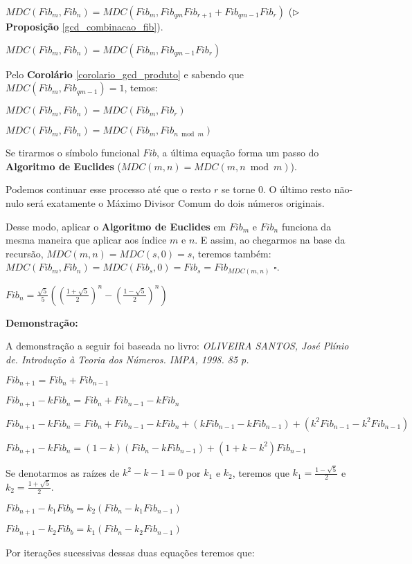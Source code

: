 $MDC(Fib_m, Fib_n) = MDC(Fib_m, Fib_{qm}Fib_{r+1} + Fib_{qm-1}Fib_{r})$ ($\triangleright$ \textbf{Proposição} \autoref{gcd_combinacao_fib}).

$MDC(Fib_m, Fib_n) = MDC(Fib_m, Fib_{qm-1}Fib_{r})$

Pelo \textbf{Corolário} \autoref{corolario_gcd_produto} e sabendo que $MDC(Fib_m,Fib_{qm-1})=1$, temos:

$MDC(Fib_m, Fib_n) = MDC(Fib_m, Fib_{r})$

$MDC(Fib_m, Fib_n) = MDC(Fib_m, Fib_{n \bmod m})$

Se tirarmos o símbolo funcional $Fib$, a última equação forma um passo do \textbf{Algoritmo de Euclides} ($MDC(m,n) = MDC(m, n \bmod m)$).

Podemos continuar esse processo até que o resto $r$ se torne $0$. O último resto não-nulo será
exatamente o Máximo Divisor Comum do dois números originais.

Desse modo, aplicar o \textbf{Algoritmo de Euclides} em $Fib_m$ e $Fib_n$ funciona da mesma maneira que aplicar aos índice $m$ e $n$.
E assim, ao chegarmos na base da recursão, $MDC(m,n) = MDC(s,0) = s$, teremos também: $MDC(Fib_m,Fib_n) = MDC(Fib_s,0) = Fib_s = Fib_{MDC(m,n)}$ $\square$.


\begin{theorem}\label{fibonacci_formula_fechada}
$Fib_n = \frac{\sqrt{5}}{5}((\frac{1+\sqrt{5}}{2})^n - (\frac{1-\sqrt{5}}{2})^n)$
\end{theorem}
\textbf{Demonstração:}

A demonstração a seguir foi baseada no livro: \textit{OLIVEIRA SANTOS, José Plínio de. Introdução à Teoria dos Números. IMPA, 1998. 85 p.}

$Fib_{n+1} = Fib_n + Fib_{n-1}$

$Fib_{n+1} - kFib_n = Fib_n + Fib_{n-1} - kFib_n$

$Fib_{n+1} - kFib_n = Fib_n + Fib_{n-1} - kFib_n + (kFib_{n-1}-kFib_{n-1}) + (k^2Fib_{n-1}-k^2Fib_{n-1})$

$Fib_{n+1} - kFib_n = (1 - k)(Fib_n - kFib_{n-1}) + (1 + k - k^2)Fib_{n-1}$

Se denotarmos as raízes de $k^2-k-1=0$ por $k_1$ e $k_2$, teremos que $k_1=\frac{1-\sqrt{5}}{2}$ e $k_2=\frac{1+\sqrt{5}}{2}$. 

$Fib_{n+1} - k_1Fib_b = k_2(Fib_n - k_1Fib_{n-1})$

$Fib_{n+1} - k_2Fib_b = k_1(Fib_n - k_2Fib_{n-1})$

Por iterações sucessivas dessas duas equações teremos que:

